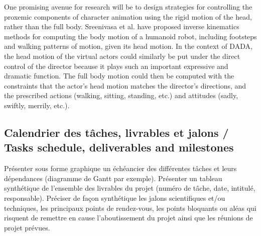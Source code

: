 One promising avenue for research will be to design strategies for controlling the proxemic components of character animation
using the rigid motion of the head, rather than the full body.  Sreenivasa et al. \cite{Sreenivasa09} have proposed inverse kinematics methods for computing  the body motion of a humanoid robot, including footsteps and walking patterns of motion, given its head motion. In the context of DADA, the head motion of the virtual actors could similarly be put under the direct control of the director because it plays such an important expressive and dramatic function. The full body motion could then be computed with the constraints that the actor's head motion matches the director's directions, and the prescribed actions (walking, sitting, standing, etc.) and attitudes (sadly, swiftly, merrily, etc.).





\subsection{Calendrier des tâches, livrables et jalons / Tasks schedule, deliverables and milestones}
\begin{xcomment} 
Pr\'esenter sous forme graphique un \'ech\'eancier des diff\'erentes tâches et leurs d\'ependances (diagramme de Gantt par exemple).
Pr\'esenter un tableau synth\'etique de l'ensemble des livrables du projet (num\'ero de tâche, date, intitul\'e, responsable).
Pr\'eciser de façon synth\'etique les jalons scientifiques et/ou techniques, les principaux points de rendez-vous, les points bloquants ou al\'eas qui risquent de remettre en cause l'aboutissement du projet ainsi que les r\'eunions de projet pr\'evues.

\end{xcomment}

\endinput